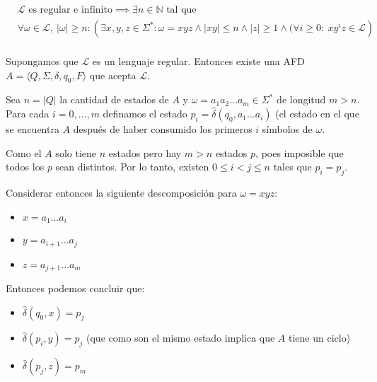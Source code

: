 \begin{align*}
   & \mathcal{L} \text{ es regular e infinito}\implies \exists n\in\mathbb{N}\text{ tal que } \\ &\forall\omega\in\mathcal{L},~|\omega|\geq n:\left( \exists x,y,z\in\Sigma^*: \omega=xyz\land|xy|\leq n\land|z|\geq 1 \land (\forall i\geq  0 :~ xy^iz\in\mathcal{L}\right) \\
\end{align*}
\begin{demo}[0.8\textwidth]  Supongamos que \(\mathcal{L}\) es un lenguaje regular. Entonces existe una AFD \(A =\langle Q, \Sigma, \delta, q_0, F\rangle\) que acepta \(\mathcal{L}\).

  Sea \(n = |Q|\) la cantidad de estados de \(A\) y \(\omega=a_1a_2\dots a_m\in\Sigma^*\) de longitud \(m > n\). Para cada \(i = 0,\dots, m\) definamos el estado \(p_i = \hat\delta(q_0, a_1\dots a_i)\) (el estado en el que se encuentra \(A\) después de haber consumido los primeros \(i\) símbolos de \(\omega\).

  Como el \(A\) solo tiene \(n\) estados pero hay \(m > n\) estados \(p\), poes imposible que todos los \(p\) sean distintos. Por lo tanto, existen \(0 \leq i < j \leq n\) tales que \(p_i = p_j\).

  Considerar entonces la siguiente descomposición para \(\omega = xyz\):
  \begin{itemize}
    \item[] \(x = a_1\dots a_i\)
    \item[] \(y = a_{i+1}\dots a_j\)
    \item[] \(z = a_{j+1}\dots a_m\)
  \end{itemize}
  Entonces podemos concluir que:
  \begin{itemize}
    \item[] \(\hat\delta(q_0, x) = p_j\)
    \item[] \(\hat\delta(p_i, y) = p_j\) (que como son el mismo estado implica que \(A\) tiene un ciclo)
    \item[] \(\hat\delta(p_j, z) = p_m\)
  \end{itemize}

\end{demo}
